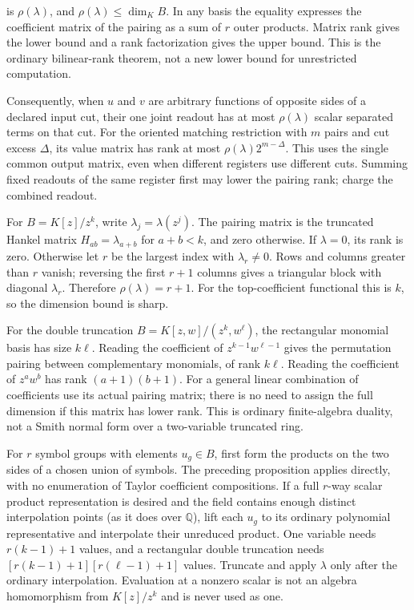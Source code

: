 \documentclass[
  11pt,
]{article}
\begin{document}
is \(\rho(\lambda)\), and \(\rho(\lambda)\le\dim_K B\). In any basis the
equality expresses the coefficient matrix of the pairing as a sum of
\(r\) outer products. Matrix rank gives the lower bound and a rank
factorization gives the upper bound. This is the ordinary bilinear-rank
theorem, not a new lower bound for unrestricted computation.

Consequently, when \(u\) and \(v\) are arbitrary functions of opposite
sides of a declared input cut, their one joint readout has at most
\(\rho(\lambda)\) scalar separated terms on that cut. For the oriented
matching restriction with \(m\) pairs and cut excess \(\Delta\), its
value matrix has rank at most \(\rho(\lambda)2^{m-\Delta}\). This uses
the single common output matrix, even when different registers use
different cuts. Summing fixed readouts of the same register first may
lower the pairing rank; charge the combined readout.

For \(B=K[z]/z^k\), write \(\lambda_j=\lambda(z^j)\). The pairing matrix
is the truncated Hankel matrix \(H_{ab}=\lambda_{a+b}\) for \(a+b<k\),
and zero otherwise. If \(\lambda=0\), its rank is zero. Otherwise let
\(r\) be the largest index with \(\lambda_r\ne0\). Rows and columns
greater than \(r\) vanish; reversing the first \(r+1\) columns gives a
triangular block with diagonal \(\lambda_r\). Therefore
\(\rho(\lambda)=r+1\). For the top-coefficient functional this is \(k\),
so the dimension bound is sharp.

For the double truncation \(B=K[z,w]/(z^k,w^\ell)\), the rectangular
monomial basis has size \(k\ell\). Reading the coefficient of
\(z^{k-1}w^{\ell-1}\) gives the permutation pairing between
complementary monomials, of rank \(k\ell\). Reading the coefficient of
\(z^a w^b\) has rank \((a+1)(b+1)\). For a general linear combination of
coefficients use its actual pairing matrix; there is no need to assign
the full dimension if this matrix has lower rank. This is ordinary
finite-algebra duality, not a Smith normal form over a two-variable
truncated ring.

For \(r\) symbol groups with elements \(u_g\in B\), first form the
products on the two sides of a chosen union of symbols. The preceding
proposition applies directly, with no enumeration of Taylor coefficient
compositions. If a full \(r\)-way scalar product representation is
desired and the field contains enough distinct interpolation points (as
it does over \(\mathbb Q\)), lift each \(u_g\) to its ordinary
polynomial representative and interpolate their unreduced product. One
variable needs \(r(k-1)+1\) values, and a rectangular double truncation
needs \([r(k-1)+1][r(\ell-1)+1]\) values. Truncate and apply \(\lambda\)
only after the ordinary interpolation. Evaluation at a nonzero scalar is
not an algebra homomorphism from \(K[z]/z^k\) and is never used as one.
\end{document}
